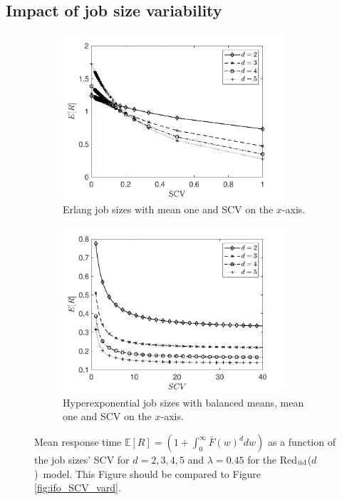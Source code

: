 \documentclass[12pt]{report}
\newcommand{\Redind}{Red$_{\textup{iid}}$($d$)}
\newcommand{\E}{\mathbb{E}}
\begin{document}
\subsection{Impact of job size variability}\label{sec:ifo_SCV_iid}
\begin{figure}[t]
\begin{subfigure}{.45\textwidth}
\begin{center}
\includegraphics[width=0.9\textwidth]{figures/Chapter3/plot_MRT_Erlang_independent_diffd.pdf}
\caption{Erlang job sizes with mean one and SCV on the $x$-axis.}
\label{fig:MRT_Erlangs_ind}
\end{center}
\end{subfigure}
\begin{subfigure}{.45\textwidth}
\begin{center}
\includegraphics[width=0.9\textwidth]{figures/Chapter3/plot_ifo_SCV_HExp_vard_ind.pdf}
\caption{Hyperexponential job sizes with balanced means, mean one and SCV on the $x$-axis.}
\label{fig:MRTdiffd_ind}
\end{center}
\end{subfigure}
\caption{Mean response time $\E[R] =\left(1+\int_0^\infty \bar{F}(w)^d dw\right)$ as a function of the job sizes' SCV for $d=2,3,4,5$ and $\lambda=0.45$ for the \Redind\ model. This Figure should be compared to Figure \ref{fig:ifo_SCV_vard}.}
\label{fig:ifo_SCV_vard_ind}
\end{figure}
\end{document}
